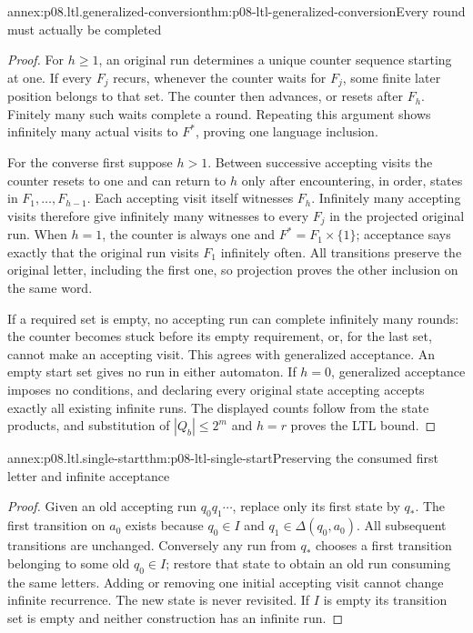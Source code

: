 \begin{annexitem}{annex:p08.ltl.generalized-conversion}{thm:p08-ltl-generalized-conversion}{Every round must actually be completed}
\begin{proof}
For \(h\geq1\), an original run determines a unique counter
sequence starting at one. If every \(F_j\) recurs, whenever
the counter waits for \(F_j\), some finite later position
belongs to that set. The counter then advances, or resets after
\(F_h\). Finitely many such waits complete a round. Repeating
this argument shows infinitely many actual visits to
\(F^*\), proving one language inclusion.

For the converse first suppose \(h>1\). Between successive
accepting visits the counter resets to one and can return to
\(h\) only after encountering, in order, states in
\(F_1,\ldots,F_{h-1}\). Each accepting visit itself
witnesses \(F_h\). Infinitely many accepting visits therefore
give infinitely many witnesses to every \(F_j\) in the
projected original run. When \(h=1\), the counter is always
one and \(F^*=F_1\times\{1\}\); acceptance says exactly
that the original run visits \(F_1\) infinitely often. All
transitions preserve the original letter, including the first
one, so projection proves the other inclusion on the same word.

If a required set is empty, no accepting run can complete
infinitely many rounds: the counter becomes stuck before its
empty requirement, or, for the last set, cannot make an
accepting visit. This agrees with generalized acceptance.
An empty start set gives no run in either automaton. If
\(h=0\), generalized acceptance imposes no conditions, and
declaring every original state accepting accepts exactly all
existing infinite runs. The displayed counts follow from the
state products, and substitution of \(|Q_b|\leq2^m\) and
\(h=r\) proves the LTL bound.
\end{proof}
\end{annexitem}

\begin{annexitem}{annex:p08.ltl.single-start}{thm:p08-ltl-single-start}{Preserving the consumed first letter and infinite acceptance}
\begin{proof}
Given an old accepting run \(q_0q_1\cdots\), replace only its
first state by \(q_*\). The first transition on \(a_0\)
exists because \(q_0\in I\) and \(q_1\in\Delta(q_0,a_0)\).
All subsequent transitions are unchanged. Conversely any run
from \(q_*\) chooses a first transition belonging to some
old \(q_0\in I\); restore that state to obtain an old run
consuming the same letters. Adding or removing one initial
accepting visit cannot change infinite recurrence. The new
state is never revisited. If \(I\) is empty its transition
set is empty and neither construction has an infinite run.
\end{proof}
\end{annexitem}

